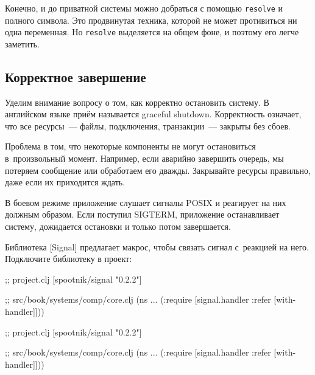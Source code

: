 Конечно, и до приватной системы можно добраться с помощью \verb|resolve| и
полного символа. Это продвинутая техника, которой не может противиться ни одна
переменная. Но \verb|resolve| выделяется на общем фоне, и поэтому его легче
заметить.

\subsection{Корректное завершение}


Уделим внимание вопросу о том, как корректно остановить систему. В английском
языке приём называется graceful shutdown. Корректность означает, что все
ресурсы~--- файлы, подключения, транзакции~--- закрыты без сбоев.

Проблема в том, что некоторые компоненты не могут остановиться в~произвольный
момент. Например, если аварийно завершить очередь, мы потеряем сообщение или
обработаем его дважды. Закрывайте ресурсы правильно, даже если их приходится
ждать.


В боевом режиме приложение слушает сигналы POSIX и реагирует на них должным
образом. Если поступил SIGTERM, приложение останавливает систему, дожидается
остановки и только потом завершается.

\pagebreakafive


Библиотека [Signal] предлагает макрос,
чтобы связать сигнал с~реакцией на него. Подключите библиотеку в проект:

\label{with-handler}

\ifnarrow

\begin{english}
  \begin{clojure}
;; project.clj
[spootnik/signal "0.2.2"]

;; src/book/systems/comp/core.clj
(ns ...
  (:require
   [signal.handler :refer
    [with-handler]]))
  \end{clojure}
\end{english}

\else

\begin{english}
  \begin{clojure}
;; project.clj
[spootnik/signal "0.2.2"]

;; src/book/systems/comp/core.clj
(ns ...
  (:require [signal.handler :refer [with-handler]]))
  \end{clojure}
\end{english}

